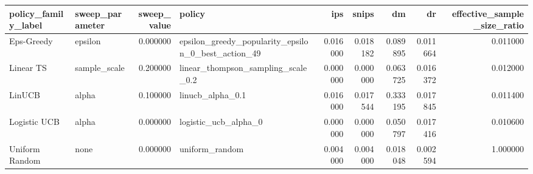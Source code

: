 \begin{tabular}{llrlrrrrr}
\toprule
policy\_family\_label & sweep\_parameter & sweep\_value & policy & ips & snips & dm & dr & effective\_sample\_size\_ratio \\
\midrule
Eps-Greedy & epsilon & 0.000000 & epsilon\_greedy\_popularity\_epsilon\_0\_best\_action\_49 & 0.016000 & 0.018182 & 0.089895 & 0.011664 & 0.011000 \\
Linear TS & sample\_scale & 0.200000 & linear\_thompson\_sampling\_scale\_0.2 & 0.000000 & 0.000000 & 0.063725 & 0.016372 & 0.012000 \\
LinUCB & alpha & 0.100000 & linucb\_alpha\_0.1 & 0.016000 & 0.017544 & 0.333195 & 0.017845 & 0.011400 \\
Logistic UCB & alpha & 0.000000 & logistic\_ucb\_alpha\_0 & 0.000000 & 0.000000 & 0.050797 & 0.017416 & 0.010600 \\
Uniform Random & none & 0.000000 & uniform\_random & 0.004000 & 0.004000 & 0.018048 & 0.002594 & 1.000000 \\
\bottomrule
\end{tabular}
